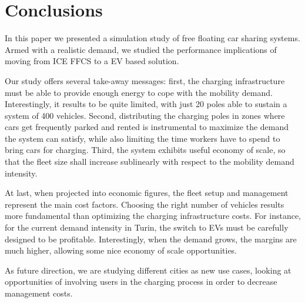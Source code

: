 \section{Conclusions}
\label{sec:10_6_conclusions}


In this paper we presented a simulation study of free floating car sharing systems. Armed with a realistic demand, we studied the performance implications of moving from ICE FFCS to a EV based solution.

Our study offers several take-away messages: first, the charging infrastructure must be able to provide enough energy to cope with the mobility demand. Interestingly, it results to be quite limited, with just 20 poles able to sustain a system of 400 vehicles.
Second, distributing the charging poles in zones where cars get frequently parked and rented is instrumental to maximize the demand the system can satisfy, while also limiting the time workers have to spend to bring cars for charging.
Third, the system exhibits useful economy of scale, so that the fleet size shall increase sublinearly with respect to the mobility demand intensity. 

At last, when projected into economic figures, the fleet setup and management represent the main cost factors. Choosing the right number of vehicles results more fundamental than optimizing the charging infrastructure costs. For instance, for the current demand intensity in Turin, the switch to EVs must be carefully designed to be profitable. Interestingly, when the demand grows, the margins are much higher, allowing some nice economy of scale opportunities.

As future direction, we are studying different cities as new use cases, looking at opportunities of involving users in the charging process in order to decrease management costs.